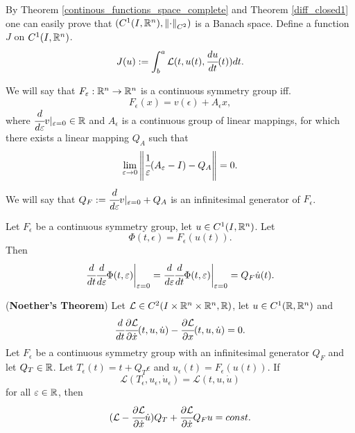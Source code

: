 \documentclass[main.tex]{subfiles}
\begin{document}
By Theorem \ref{continous_functions_space_complete} and Theorem \ref{diff_closed1} one can easily prove that $(C^1(I, \reals^n), \norm{\cdot}_{C^2})$ is a Banach space.
Define a function $J$ on $C^1(I, \reals^n)$.
\begin{equation}
    J(u) := \int^a_b \mathcal{L}(t, u(t), \cfrac{du}{dt}(t)) dt.
\end{equation}
\begin{definition}
We will say that $F_\epsilon: \reals^n \to \reals^n$ is a continuous symmetry group iff.
\begin{equation}
F_\epsilon(x) = v(\epsilon) + A_\epsilon x,
\end{equation}
where $\cfrac{d}{d\epsilon}v \vert_{\epsilon = 0} \in \reals$ and $A_\epsilon$ is a continuous group of linear mappings, for which there exists a linear mapping $Q_A$ such that 
\begin{equation}
\lim_{\epsilon\to 0} \norm{\cfrac{1}{\epsilon}(A_\epsilon - I)  - Q_A} = 0.
\end{equation}
We will say that $Q_F:=\cfrac{d}{d\epsilon} v \vert_{\epsilon = 0} +Q_A$ is an infinitesimal generator of $F_\epsilon$.
\end{definition}
\begin{lemma}
\label{symetry_group_lemma}
Let $F_\epsilon$ be a continuous symmetry group, let $u\in C^1(I, \reals^n)$.
Let
\begin{equation}
    \Phi(t, \epsilon) = F_\epsilon(u(t)).
\end{equation}
Then
\begin{equation}
    \cfrac{d}{dt} \cfrac{d}{d\epsilon} \Phi(t, \epsilon) \bigg\vert_{\epsilon = 0} = 
    \cfrac{d}{d\epsilon} \cfrac{d}{dt} \Phi(t, \epsilon) \bigg\vert_{\epsilon = 0} = Q_F \dot{u}(t).
\end{equation}
\end{lemma}
\begin{theorem} (\textbf{Noether's Theorem})
\label{noether}
Let $\mathcal{L}\in C^2(I\times \reals^n \times\reals^n, \reals)$, let $u\in C^1(\reals, \R^n)$ and
\begin{equation}
\label{lagrange_equation}
    \cfrac{d}{dt} \cfrac{\partial \mathcal{L}}{\partial \dot{x}}(t, u, \dot{u}) - \cfrac{\partial \mathcal{L}}{\partial x}(t, u, \dot{u}) = 0.
\end{equation}
Let $F_\epsilon$ be a continuous symmetry group with an infinitesimal generator $Q_F$ and let $Q_T\in \reals$.
Let $T_\epsilon(t) = t + Q_T\epsilon$ and  $u_\epsilon(t) = F_\epsilon(u(t))$.
If 
\begin{equation}
\label{lagrange_invariant_symetry}
\mathcal{L}(T_\epsilon, u_\epsilon, \dot{u}_\epsilon) = \mathcal{L}(t, u, \dot{u})
\end{equation}
for all $\epsilon\in \reals$, then
\begin{equation}
\label{noether_thesis}
    (\mathcal{L} - \cfrac{\partial \mathcal{L}}{\partial \dot{x}}\dot{u})Q_T +  \cfrac{\partial \mathcal{L}}{\partial \dot{x}} Q_Fu = const.
\end{equation}
\end{theorem}
\end{document}
